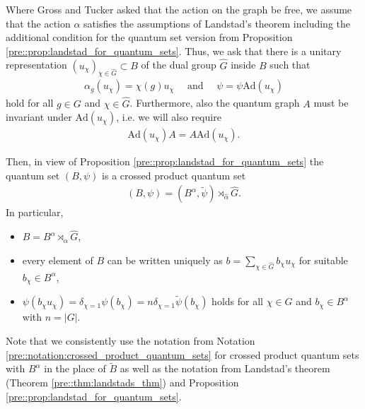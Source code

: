 \documentclass{amsart}
\theoremstyle{definition}
\theoremstyle{definition}
\begin{document}
Where Gross and Tucker asked that the action on the graph be free, we assume that the action $\alpha$ satisfies the assumptions of Landstad's theorem including the additional condition for the quantum set version from Proposition \ref{pre::prop:landstad_for_quantum_sets}. Thus, we ask that there is a unitary representation $(u_\chi)_{\chi \in \hat{G}} \subset B$ of the dual group $\hat{G}$ inside $B$ such that
\begin{align*}
    \alpha_g(u_\chi) = \chi(g) u_\chi
    \quad \text{ and } \quad
    \psi = \psi \mathrm{Ad}(u_\chi)
\end{align*}
hold for all $g \in G$ and $\chi \in \hat{G}$. Furthermore, also the quantum graph $A$ must be invariant under $\mathrm{Ad}(u_\chi)$, i.e. we will also require
\begin{align}
    \label{gtt::eq:A_is_invariant_under_Ad_u_chi}
    \mathrm{Ad}(u_\chi) A = A \mathrm{Ad}(u_\chi).
\end{align}

Then, in view of Proposition \ref{pre::prop:landstad_for_quantum_sets} the quantum set $(B, \psi)$ is a crossed product quantum set
\begin{align*}
    (B, \psi) = (B^\alpha, \tilde{\psi}) \rtimes_{\hat{\alpha}} \hat{G}.
\end{align*}
In particular, 
\begin{itemize}
    \item $B = B^\alpha \rtimes_{\hat{\alpha}} \hat{G}$,
    \item every element of $B$ can be written uniquely as $b = \sum_{\chi \in \hat{G}} b_\chi u_\chi$ for suitable $b_\chi \in B^\alpha$,
    \item $\psi(b_\chi u_\chi) = \delta_{\chi=1} \psi(b_\chi) = n \delta_{\chi=1} \tilde{\psi}(b_\chi)$ holds for all $\chi \in \hat{G}$ and $b_\chi \in B^\alpha$ with $n = |G|$.
\end{itemize}

Note that we consistently use the notation from Notation \ref{pre::notation:crossed_product_quantum_sets} for crossed product quantum sets with $B^\alpha$ in the place of $\tilde{B}$ as well as the notation from Landstad's theorem (Theorem \ref{pre::thm:landstads_thm}) and Proposition \ref{pre::prop:landstad_for_quantum_sets}.
\end{document}
